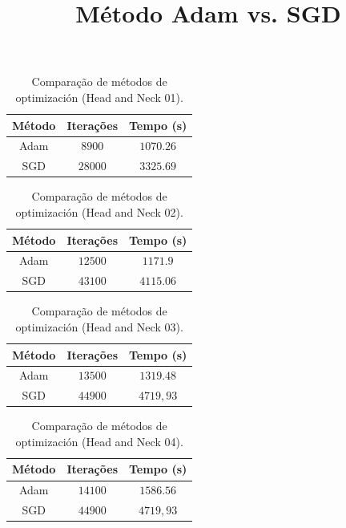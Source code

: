 \documentclass[a4paper,12pt]{article}
\title{Método Adam vs. SGD}
\author{}
\date{}
\begin{document}
\maketitle %

\vspace{-2cm}
\begin{table}[!ht]
    \centering
    \caption{Comparação de métodos de optimización (Head and Neck 01).}
    \vspace{0.5cm}
    \label{tab:exemplo}
    \begin{tabular}{ccc}
        \hline
        Método & Iterações & Tempo (s) \\
        \hline
        Adam & $8900$ &  $1070.26$ \\
        SGD & $28000$ & $3325.69$ \\
        \hline
    \end{tabular}
\end{table}
\vspace{-1cm}
\begin{table}[!ht]
    \centering
    \caption{Comparação de métodos de optimización (Head and Neck 02).}
    \vspace{0.5cm}
    \label{tab:exemplo}
    \begin{tabular}{ccc}
        \hline
        Método & Iterações & Tempo (s) \\
        \hline
        Adam & $12500$ &  $1171.9$ \\
        SGD & $43100$ & $4115.06$ \\
        \hline
    \end{tabular}
\end{table}
\vspace{-1cm}
\begin{table}[!ht]
    \centering
    \caption{Comparação de métodos de optimización (Head and Neck 03).}
    \vspace{0.5cm}
    \label{tab:exemplo}
    \begin{tabular}{ccc}
        \hline
        Método & Iterações & Tempo (s) \\
        \hline
        Adam & $13500$ &  $1319.48$ \\
        SGD & $44900$ & $4719,93$ \\
        \hline
    \end{tabular}
\end{table}

\vspace{-1cm}
\begin{table}[!ht]
    \centering
    \caption{Comparação de métodos de optimización (Head and Neck 04).}
    \vspace{0.5cm}
    \label{tab:exemplo}
    \begin{tabular}{ccc}
        \hline
        Método & Iterações & Tempo (s) \\
        \hline
        Adam & $14100$ &  $1586.56$ \\
        SGD & $44900$ & $4719,93$ \\
        \hline
    \end{tabular}
\end{table}
\end{document}

